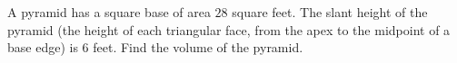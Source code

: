 A pyramid has a square base of area $28$ square feet. The slant height of the pyramid (the height of each triangular face, from the apex to the midpoint of a base edge) is $6$ feet. Find the volume of the pyramid.
